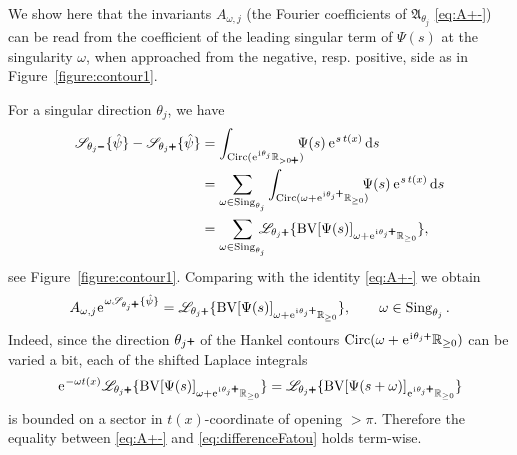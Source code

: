 \documentclass[a4paper,11pt]{amsart}
\numberwithin{equation}{section}
\newcommand{\R}{{\mathbb R}}
\renewcommand{\i}{\mathrm{i}\mkern.25\thinmuskip}
\renewcommand{\d}{\ensuremath{\operatorname{d}\!}}
\newcommand{\e}{\ensuremath{\mkern.25\thinmuskip\mathrm{e}\mkern.4\thinmuskip}}
\newcommand{\Aa}{\mathfrak{A}}
\newcommand{\Laplace}{\mathscr{L}}
\newcommand{\BSum}{\mathscr{S}}
\newcommand{\BV}{\operatorname{BV}}
\newcommand{\Sing}{\operatorname{Sing}}
\newcommand{\Circ}{\operatorname{Circ}}
\newcommand{\pls}{{\scalebox{0.7}{$\pmb{+}$}}}
\newcommand{\mns}{{\scalebox{0.7}{$\pmb{-}$}}}
\theoremstyle{definition}
\begin{document}
We show here that the invariants ${A}_{\omega,j}$ (the Fourier coefficients of $\Aa_{\theta_j}$ \eqref{eq:A+-}) can be read from the coefficient of the leading singular term of $\Psi(s)$ at the singularity $\omega$, when approached from the negative, resp. positive, side as in Figure~\ref{figure:contour1}.


For a singular direction $\theta_j$, we have
\begin{equation}\label{eq:differenceFatou}
	\begin{aligned}
		\BSum_{\theta_j\mns}\{\hat\psi\}-\BSum_{\theta_j\pls}\{\hat\psi\}&=\int_{\Circ(\e^{\i\theta_j}\R_{>0\pls})}\!\!\!\! \Psi(s)\,\e^{s\,t(x)}\d s\\
		&=\sum_{\omega\in\Sing_{\theta_j}}\int_{\Circ(\omega+\e^{\i\theta_j\pls}\R_{\geq 0})}\!\!\!\! \Psi(s)\,\e^{s\,t(x)}\d s\\
		&=\sum_{\omega\in\Sing_{\theta_j}}\!\!\!\!\Laplace_{\theta_j\pls}\{\BV[\Psi(s)]_{\omega+\e^{\i\theta_j\pls}\R_{\geq 0}}\},
	\end{aligned}
\end{equation}
see Figure~\ref{figure:contour1}.
Comparing with the identity \eqref{eq:A+-} we obtain
\begin{equation}\label{eq:Aomega}
	A_{\omega,j} \e^{\omega \BSum_{\theta_j\pls}\{\hat\psi\}}=\Laplace_{\theta_j\pls}\{\BV[\Psi(s)]_{\omega+\e^{\i\theta_j\pls}\R_{\geq 0}}\},\qquad \omega\in\Sing_{\theta_j}.
\end{equation} 
Indeed, since the direction  $\theta_j\pls$ of the Hankel contours $\Circ(\omega +\e^{\i\theta_j\pls}\R_{\geq 0})$ can be varied a bit, each of the shifted Laplace integrals 
\[\e^{-\omega t(x)}\Laplace_{\theta_j\pls}\{\BV[\Psi(s)]_{\omega+\e^{\i\theta_j\pls}\R_{\geq 0}}\}=
\Laplace_{\theta_j\pls}\{\BV[\Psi(s+\omega)]_{\e^{\i\theta_j\pls}\R_{\geq 0}}\}\]
is bounded on a sector in $t(x)$-coordinate of opening $>\pi$.
Therefore the equality between \eqref{eq:A+-} and \eqref{eq:differenceFatou} holds term-wise. 
\end{document}
